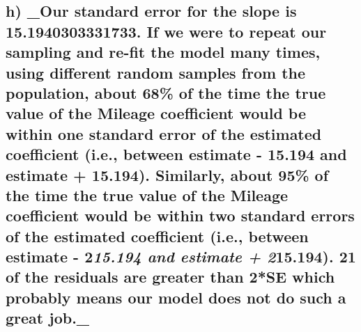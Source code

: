 \documentclass[
]{article}
\begin{document}
\hypertarget{h-_our-standard-error-for-the-slope-is-15.1940303331733.-if-we-were-to-repeat-our-sampling-and-re-fit-the-model-many-times-using-different-random-samples-from-the-population-about-68-of-the-time-the-true-value-of-the-mileage-coefficient-would-be-within-one-standard-error-of-the-estimated-coefficient-i.e.-between-estimate---15.194-and-estimate-15.194.-similarly-about-95-of-the-time-the-true-value-of-the-mileage-coefficient-would-be-within-two-standard-errors-of-the-estimated-coefficient-i.e.-between-estimate---215.194-and-estimate-215.194.-21-of-the-residuals-are-greater-than-2se-which-probably-means-our-model-does-not-do-such-a-great-job._}{%
\subsection{\texorpdfstring{h) \_Our standard error for the slope is
15.1940303331733. If we were to repeat our sampling and re-fit the model
many times, using different random samples from the population, about
68\% of the time the true value of the Mileage coefficient would be
within one standard error of the estimated coefficient (i.e., between
estimate - 15.194 and estimate + 15.194). Similarly, about 95\% of the
time the true value of the Mileage coefficient would be within two
standard errors of the estimated coefficient (i.e., between estimate -
2\emph{15.194 and estimate + 2}15.194). 21 of the residuals are greater
than 2*SE which probably means our model does not do such a great
job.\_}{h) \_Our standard error for the slope is 15.1940303331733. If we were to repeat our sampling and re-fit the model many times, using different random samples from the population, about 68\% of the time the true value of the Mileage coefficient would be within one standard error of the estimated coefficient (i.e., between estimate - 15.194 and estimate + 15.194). Similarly, about 95\% of the time the true value of the Mileage coefficient would be within two standard errors of the estimated coefficient (i.e., between estimate - 215.194 and estimate + 215.194). 21 of the residuals are greater than 2*SE which probably means our model does not do such a great job.\_}}\label{h-_our-standard-error-for-the-slope-is-15.1940303331733.-if-we-were-to-repeat-our-sampling-and-re-fit-the-model-many-times-using-different-random-samples-from-the-population-about-68-of-the-time-the-true-value-of-the-mileage-coefficient-would-be-within-one-standard-error-of-the-estimated-coefficient-i.e.-between-estimate---15.194-and-estimate-15.194.-similarly-about-95-of-the-time-the-true-value-of-the-mileage-coefficient-would-be-within-two-standard-errors-of-the-estimated-coefficient-i.e.-between-estimate---215.194-and-estimate-215.194.-21-of-the-residuals-are-greater-than-2se-which-probably-means-our-model-does-not-do-such-a-great-job._}}
\end{document}
